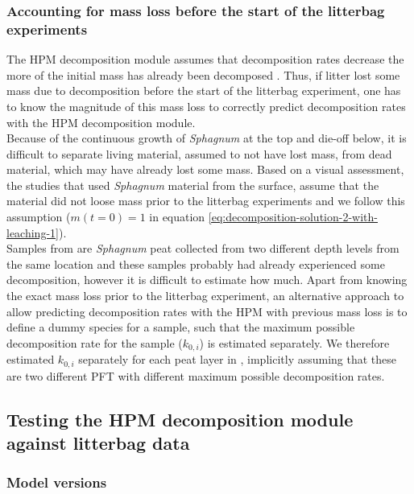 \documentclass[esd, manuscript]{copernicus}
\begin{document}
\hypertarget{sdm-003-methods-6}{%
\subsubsection{Accounting for mass loss before the start of the litterbag experiments}\label{sdm-003-methods-6}}

The HPM decomposition module assumes that decomposition rates decrease the more of the initial mass has already been decomposed \citep{Frolking.2001, Frolking.2010}. Thus, if litter lost some mass due to decomposition before the start of the litterbag experiment, one has to know the magnitude of this mass loss to correctly predict decomposition rates with the HPM decomposition module.\\
Because of the continuous growth of \emph{Sphagnum} at the top and die-off below, it is difficult to separate living material, assumed to not have lost mass, from dead material, which may have already lost some mass. Based on a visual assessment, the studies that used \emph{Sphagnum} material from the surface, assume that the material did not loose mass prior to the litterbag experiments and we follow this assumption (\(m(t = 0) = 1\) in equation \eqref{eq:decomposition-solution-2-with-leaching-1}).\\
Samples from \citet{Prevost.1997} are \emph{Sphagnum} peat collected from two different depth levels from the same location and these samples probably had already experienced some decomposition, however it is difficult to estimate how much. Apart from knowing the exact mass loss prior to the litterbag experiment, an alternative approach to allow predicting decomposition rates with the HPM with previous mass loss is to define a dummy species for a sample, such that the maximum possible decomposition rate for the sample (\(k_{0,i}\)) is estimated separately. We therefore estimated \(k_{0,i}\) separately for each peat layer in \citet{Prevost.1997}, implicitly assuming that these are two different PFT with different maximum possible decomposition rates.

\hypertarget{sdm-003-methods-7}{%
\subsection{Testing the HPM decomposition module against litterbag data}\label{sdm-003-methods-7}}

\hypertarget{sdm-003-methods-8}{%
\subsubsection{Model versions}\label{sdm-003-methods-8}}
\end{document}
